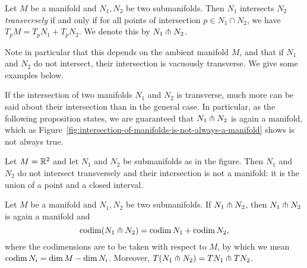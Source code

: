 \begin{definition}[Transversality]
    Let $M$ be a manifold and $N_1, N_2$ be two submanifolds.
    Then $N_1$ intersects $N_2$ \emph{transversely} if and only if for all points of intersection $p \in N_1 \cap N_2$, we have
    $T_pM = T_pN_1 + T_p N_2$.
    We denote this by $ N_1 \pitchfork N_2$.\sidenotemark
\end{definition}
Note in particular that this depends on the ambient manifold $M$, and that if $N_1$ and $N_2$ do not intersect, their intersection is vacuously transverse.
We give some examples below.
\begin{figure}[H]
    \centering
\end{figure}
If the intersection of two manifolds $ N_1$ and $N_2$ is transverse, much more can be said about their intersection than in the general case.
In particular, as the following proposition states, we are guaranteed that $N_1 \pitchfork N_2$ is again a manifold, which as Figure~\ref{fig:intersection-of-manifolds-is-not-always-a-manifold} shows is not always true.
\begin{marginfigure}
    \centering
    \caption{Let $M = \mathbb{R}^2$ and let $N_1$ and $N_2$ be submanifolds as in the figure. Then $N_1$ and $N_2$ do not intersect transversely and their intersection is not a manifold: it is the union of a point and a closed interval.}
    \label{fig:intersection-of-manifolds-is-not-always-a-manifold}
\end{marginfigure}
\begin{prop}
    Let $M$ be a manifold and $N_1, N_2$ be two submanifolds. If $ N_1 \pitchfork N_2$, then $ N_1 \pitchfork N_2$ is again a manifold and 
    \[
        \operatorname{codim} (N_1 \pitchfork N_2) = \operatorname{codim} N_1 + \operatorname{codim} N_2
    ,\] 
    where the codimensions are to be taken with respect to $M$, by which we mean $\operatorname{codim} N_i = \dim M - \dim N_i$.
    Moreover, $T(N_1\pitchfork N_2) = TN_1 \pitchfork TN_2$.
\label{prop:transverse-codimensions-add}
\end{prop}
